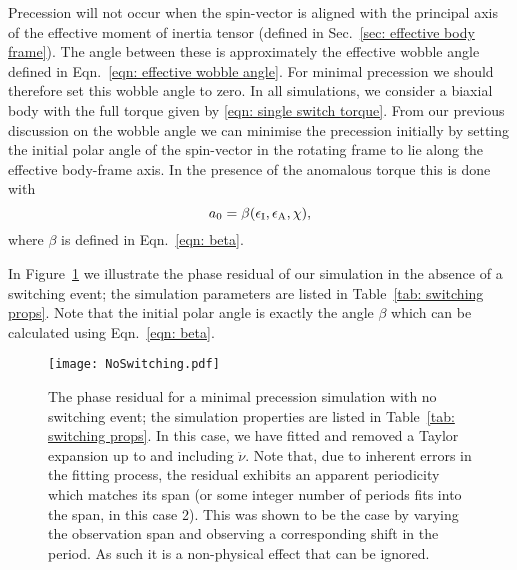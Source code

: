 \documentclass[../full_thesis/full_thesis.tex]{subfiles}
\newcommand{\thisdir}{../inertial_frame}
\begin{document}
Precession will not occur when the spin-vector is aligned with the principal
axis of the effective moment of inertia tensor (defined in Sec.~\ref{sec:
effective body frame}). The angle between these is approximately the
effective wobble angle defined in Eqn.~\eqref{eqn: effective wobble angle}.
For minimal precession we should therefore set this wobble angle to
zero. In all simulations, we consider a biaxial body with the full torque given
by \eqref{eqn: single switch torque}. From our previous discussion on the
wobble angle we can minimise the precession initially by setting the initial polar angle
of the spin-vector in the rotating frame to lie along the effective body-frame
axis. In the presence of the anomalous torque this is done with
\begin{equation}
a_{0} = \beta(\epsilon_{\mathrm{I}}, \epsilon_{\mathrm{A}}, \chi),
\end{equation}
where $\beta$ is defined in Eqn.~\eqref{eqn: beta}.

In Figure~\ref{fig: no switching} we illustrate the phase residual of our
simulation in the absence of a switching event; the simulation parameters are
listed in Table~\ref{tab: switching props}. Note that the initial polar angle
is exactly the angle $\beta$ which can be calculated using Eqn.~\eqref{eqn:
beta}.

\begin{figure}[htb]
\texttt{[image: NoSwitching.pdf]}
\caption{The phase residual for a minimal precession simulation with no
         switching event; the simulation properties are listed in
         Table~\ref{tab: switching props}. In this case, we have fitted and
         removed a Taylor expansion up to and including $\ddot{\nu}$.
         Note that, due to inherent errors in the fitting process, the residual
         exhibits an apparent periodicity which matches its span (or some integer
         number of periods fits into the span, in this case 2). This was shown
         to be the case by varying the observation span and observing a
         corresponding shift in the period. As such it is a non-physical effect
         that can be ignored.
}
\label{fig: no switching}
\end{figure}

\begin{table}[htb]
\centering

\caption{Simulation properties used for Figure~\ref{fig: no switching},
Figure~\ref{fig: switching without anom}, and Figure~\ref{fig: switching with anom}.}
\label{tab: switching props}
\end{table}
\end{document}
